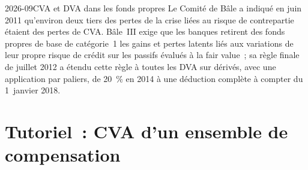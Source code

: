 \begin{dated}{2026-09}{CVA et DVA dans les fonds propres}\label{dat:rc:credit-and-debit-valuation-adjustments:dva}
Le Comité de Bâle a indiqué en juin 2011 qu'environ deux tiers des pertes de la crise liées au
risque de contrepartie étaient des pertes de CVA. Bâle~III exige que les banques retirent des
fonds propres de base de catégorie~1 les gains et pertes latents liés aux variations de leur propre risque de crédit sur
les passifs évalués à la fair value~; sa règle finale de juillet 2012 a étendu cette règle à toutes les DVA sur dérivés,
avec une application par paliers, de 20~\% en 2014 à une déduction complète à compter du 1~janvier 2018.
\end{dated}

\begin{omfigure}

\label{fig:rc:credit-and-debit-valuation-adjustments:dva}
\end{omfigure}

\section{Tutoriel~: CVA d'un ensemble de compensation}\label{tut:rc:credit-and-debit-valuation-adjustments:tutorial}

